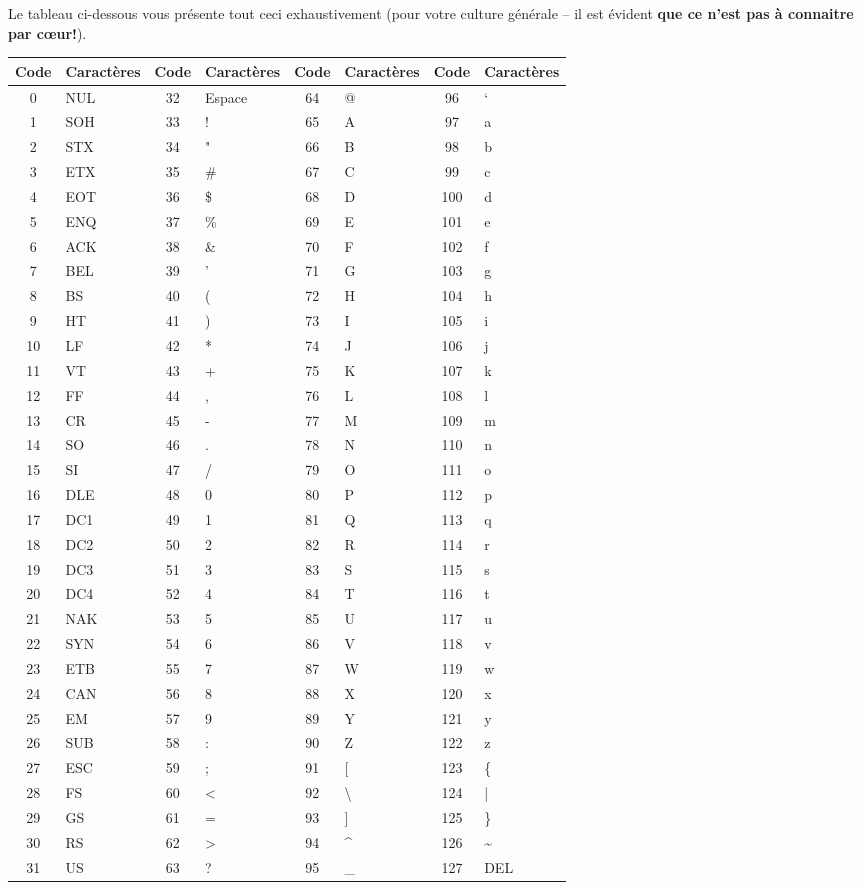 \documentclass[12pt]{article}
\begin{document}
	Le tableau ci-dessous vous présente tout ceci exhaustivement (pour votre culture générale -- il est évident \textbf{que ce n'est pas à connaitre par cœur!}).
	
	\begin{tabular}{|c|l||c|l||c|l||c|l|}
		\hline
		Code & Caractères & Code & Caractères & Code & Caractères & Code & Caractères \\
		\hline
		0 & NUL & 32 & Espace & 64 & @ & 96 & ` \\
		1 & SOH & 33 & ! & 65 & A & 97 & a \\
		2 & STX & 34 & " & 66 & B & 98 & b \\
		3 & ETX & 35 & \# & 67 & C & 99 & c \\
		4 & EOT & 36 & \$ & 68 & D & 100 & d \\
		5 & ENQ & 37 & \% & 69 & E & 101 & e \\
		6 & ACK & 38 & \& & 70 & F & 102 & f \\
		7 & BEL & 39 & ' & 71 & G & 103 & g \\
		8 & BS & 40 & ( & 72 & H & 104 & h \\
		9 & HT & 41 & ) & 73 & I & 105 & i \\
		10 & LF & 42 & * & 74 & J & 106 & j \\
		11 & VT & 43 & + & 75 & K & 107 & k \\
		12 & FF & 44 & , & 76 & L & 108 & l \\
		13 & CR & 45 & - & 77 & M & 109 & m \\
		14 & SO & 46 & . & 78 & N & 110 & n \\
		15 & SI & 47 & / & 79 & O & 111 & o \\
		16 & DLE & 48 & 0 & 80 & P & 112 & p \\
		17 & DC1 & 49 & 1 & 81 & Q & 113 & q \\
		18 & DC2 & 50 & 2 & 82 & R & 114 & r \\
		19 & DC3 & 51 & 3 & 83 & S & 115 & s \\
		20 & DC4 & 52 & 4 & 84 & T & 116 & t \\
		21 & NAK & 53 & 5 & 85 & U & 117 & u \\
		22 & SYN & 54 & 6 & 86 & V & 118 & v \\
		23 & ETB & 55 & 7 & 87 & W & 119 & w \\
		24 & CAN & 56 & 8 & 88 & X & 120 & x \\
		25 & EM & 57 & 9 & 89 & Y & 121 & y \\
		26 & SUB & 58 & : & 90 & Z & 122 & z \\
		27 & ESC & 59 & ; & 91 & [ & 123 & \{ \\
		28 & FS & 60 & < & 92 & \textbackslash & 124 & | \\
		29 & GS & 61 & = & 93 & ] & 125 & \} \\
		30 & RS & 62 & > & 94 & \textasciicircum & 126 & \textasciitilde \\
		31 & US & 63 & ? & 95 & \_ & 127 & DEL \\
		\hline
	\end{tabular}
	
\end{document}

